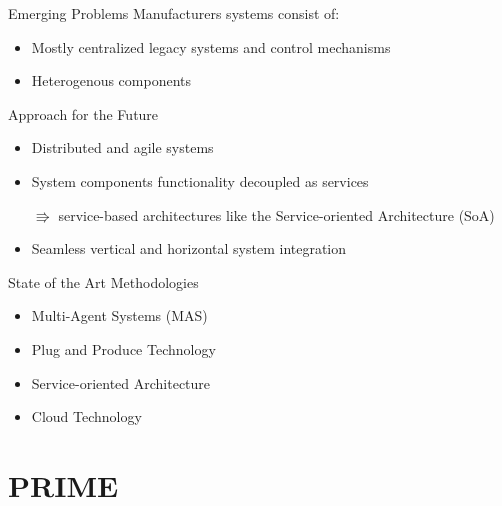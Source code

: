 \documentclass[12pt]{beamer}
\begin{document}
\begin{frame}{Emerging Problems}
	Manufacturers systems consist of:
	\begin{itemize}
		\item Mostly centralized legacy systems and control mechanisms
		\newline
		
		\item Heterogenous components
	\end{itemize}
\end{frame}

\begin{frame}{Approach for the Future}
	\begin{itemize}
		\item Distributed and agile systems
		\newline
		
		\item System components functionality decoupled as services
		\newline
		
		$\Rrightarrow$ service-based architectures like the Service-oriented Architecture (SoA)
		\newline
		
		\item Seamless vertical and horizontal system integration
	\end{itemize}
\end{frame}

\begin{frame}{State of the Art Methodologies}
	\begin{itemize}
		\item Multi-Agent Systems (MAS)
		\newline
		
		\item Plug and Produce Technology
		\newline
		
		\item Service-oriented Architecture
		\newline
		
		\item Cloud Technology
	\end{itemize}
\end{frame}

\section[PRIME] {PRIME}
\end{document}
